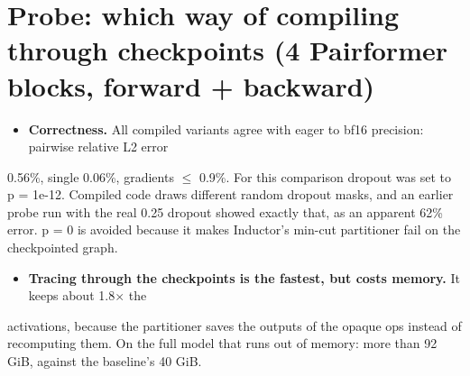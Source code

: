 \documentclass[10pt]{article}
\begin{document}
\section{Probe: which way of compiling through checkpoints (4 Pairformer blocks, forward + backward)}

\begin{table}[H]\centering\small
{}
\end{table}

\begin{itemize}
\item \textbf{Correctness.} All compiled variants agree with eager to bf16 precision: pairwise relative L2 error
\end{itemize}
0.56\%, single 0.06\%, gradients $\leq$ 0.9\%. For this comparison dropout was set to p = 1e-12. Compiled code draws different random dropout masks, and an earlier probe run with the real 0.25 dropout showed exactly that, as an apparent 62\% error. p = 0 is avoided because it makes Inductor's min-cut partitioner fail on the checkpointed graph.

\begin{itemize}
\item \textbf{Tracing through the checkpoints is the fastest, but costs memory.} It keeps about 1.8$\times$ the
\end{itemize}
activations, because the partitioner saves the outputs of the opaque ops instead of recomputing them. On the full model that runs out of memory: more than 92 GiB, against the baseline's 40 GiB.
\end{document}
